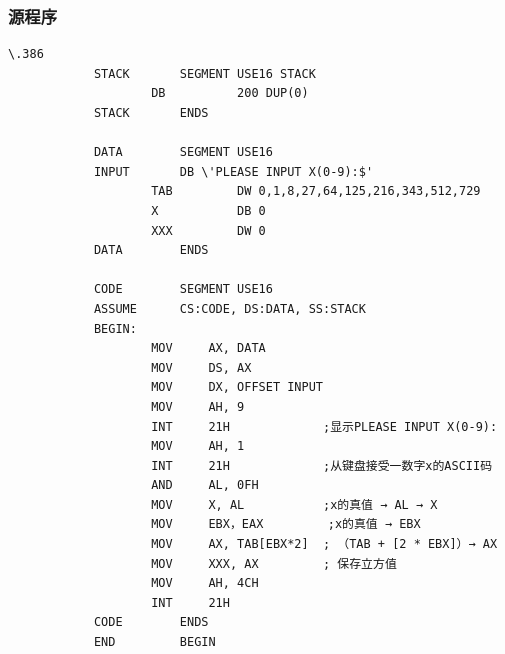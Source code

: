 \documentclass{article}
\newenvironment{codeFont}{\codeF}{\par}
\begin{document}
	\subsubsection{源程序}
	\begin{codeFont}
		\begin{lstlisting}[gobble=12]
			\.386
			STACK		SEGMENT USE16 STACK
					DB			200 DUP(0)
			STACK		ENDS

			DATA		SEGMENT USE16
			INPUT		DB \'PLEASE INPUT X(0-9):$'
					TAB			DW 0,1,8,27,64,125,216,343,512,729
					X			DB 0
					XXX			DW 0
			DATA		ENDS

			CODE		SEGMENT USE16
			ASSUME		CS:CODE, DS:DATA, SS:STACK
			BEGIN:
					MOV		AX, DATA
					MOV		DS, AX
					MOV		DX, OFFSET INPUT
					MOV		AH, 9
					INT		21H				;显示PLEASE INPUT X(0-9):
					MOV		AH, 1
					INT		21H				;从键盘接受一数字x的ASCII码
					AND		AL, 0FH
					MOV		X, AL			;x的真值 → AL → X
					MOV		EBX，EAX			;x的真值 → EBX
					MOV		AX, TAB[EBX*2]	; （TAB + [2 * EBX]）→ AX
					MOV		XXX, AX			; 保存立方值
					MOV		AH, 4CH
					INT		21H
			CODE		ENDS
			END			BEGIN
		\end{lstlisting}
	\end{codeFont}
\end{document}
